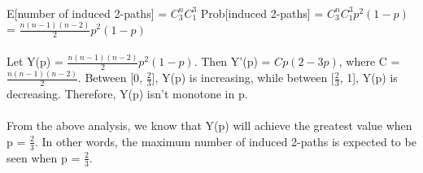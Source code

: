 \begin{problem}{2} ~\\
E[number of induced 2-paths] = $C_3^n C_1^3$ Prob[induced 2-paths] = $C_3^n C_1^3 p^2 (1-p)$ = $\frac{n(n-1)(n-2)}{2} p^2 (1-p)$\\
\\
Let Y(p) = $\frac{n(n-1)(n-2)}{2} p^2 (1-p)$. Then Y'(p) = $C p(2-3p)$, where C = $\frac{n(n-1)(n-2)}{2}$. Between [0, $\frac{2}{3}$], Y(p) is increasing, while between [$\frac{2}{3}$, 1], Y(p) is decreasing. Therefore, Y(p) isn't monotone in p.\\
\\
From the above analysis, we know that Y(p) will achieve the greatest value when p = $\frac{2}{3}$. In other words, the maximum number of induced 2-paths is expected to be seen when p = $\frac{2}{3}$.
\end{problem}